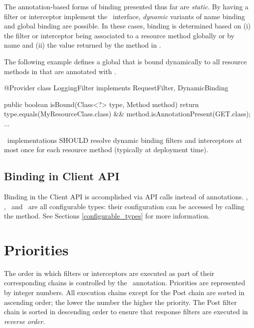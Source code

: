 The annotation-based forms of binding presented thus far are {\em static}.  By having a filter or interceptor implement the \DynamicBinding\ interface, {\em dynamic} variants of name binding and global binding are possible. In these cases, binding is determined based on (i) the filter or interceptor being associated to a resource method globally or by name and (ii) the value returned by the  method in \DynamicBinding. 

The following example defines a global  that is bound dynamically to all resource methods in  that are annotated with .

\begin{listing}{1}
@Provider
class LoggingFilter implements RequestFilter, DynamicBinding {

    public boolean isBound(Class<?> type, Method method) {
        return type.equals(MyResourceClass.class) 
            && method.isAnnotationPresent(GET.class);    
    }
    ...
}
\end{listing}

\jaxrs\ implementations SHOULD resolve dynamic binding filters and interceptors at most once for each resource method (typically at deployment time).

\subsection{Binding in Client API}
\label{binding_in_client_api}

Binding in the Client API is accomplished via API calls instead of annotations. \Client, \Invocation, \InvocationBuilder\ and \Target\ are all configurable types: their configuration can be accessed by calling the  method. See Sections \ref{configurable_types} for more information.

\section{Priorities}
\label{priorities}

The order in which filters or interceptors are executed as part of their corresponding chains is controlled by the \BindingPriority\ annotation.
Priorities are represented by integer numbers. All execution chains except
for the Post chain are sorted in ascending order; the lower the number the higher the priority. The Post filter chain is sorted in descending order to ensure that response filters are executed in {\em reverse order}.


